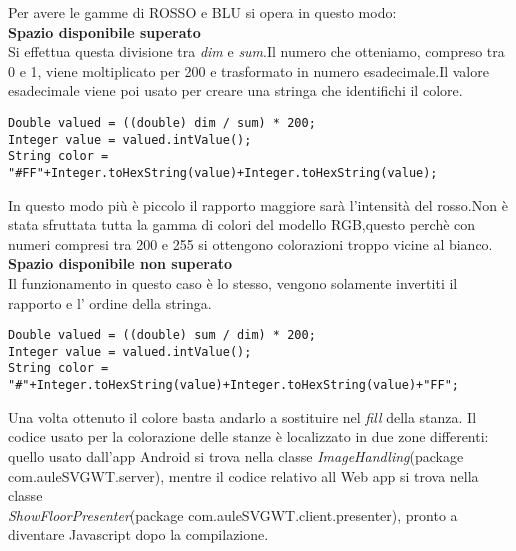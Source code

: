 Per avere le gamme di ROSSO e BLU si opera in questo modo:
\\\textbf{Spazio disponibile superato}\\Si effettua questa divisione tra \textit{dim} e \textit{sum}.Il numero che otteniamo, compreso tra 0 e 1, viene moltiplicato per 200 e trasformato in numero esadecimale.Il valore esadecimale viene poi usato per creare una stringa che identifichi il colore.
\begin{lstlisting}
Double valued = ((double) dim / sum) * 200;
Integer value = valued.intValue();
String color = "#FF"+Integer.toHexString(value)+Integer.toHexString(value);
\end{lstlisting}
In questo modo pi\`u \`e piccolo il rapporto maggiore sar\`a l'intensit\`a del rosso.Non \`e stata sfruttata tutta la gamma di colori del modello RGB,questo perch\`e con numeri compresi tra 200 e 255 si ottengono colorazioni troppo vicine al bianco.
\\\textbf{Spazio disponibile non superato}\\Il funzionamento in questo caso \`e lo stesso, vengono solamente invertiti il rapporto e l' ordine della stringa.
\begin{lstlisting}
Double valued = ((double) sum / dim) * 200;
Integer value = valued.intValue();
String color = "#"+Integer.toHexString(value)+Integer.toHexString(value)+"FF";
\end{lstlisting}
Una volta ottenuto il colore basta andarlo a sostituire nel \textit{fill} della stanza.
Il codice usato per la colorazione delle stanze \`e localizzato in due zone differenti: quello usato dall'app Android si trova nella classe \textit{ImageHandling}(package com.auleSVGWT.server), mentre il codice relativo all Web app si trova nella classe\\ \textit{ShowFloorPresenter}(package com.auleSVGWT.client.presenter), pronto a diventare Javascript dopo la compilazione.


